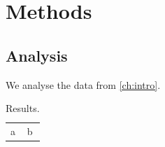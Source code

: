 \chapter{Methods}
\label{ch:methods}



\section{Analysis}
\label{sec:analysis}

We analyse the data from \cref{ch:intro}.

\begin{table}
  \caption{Results.}
  \label{tab:results}
  \begin{tabular}{ll}
    a & b \\
  \end{tabular}
\end{table}
